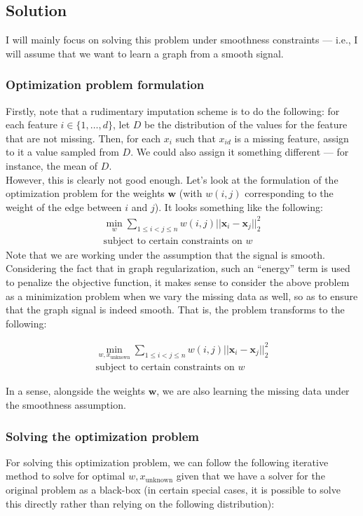 \documentclass[a4paper]{article}
\newcommand{\nl}{\vspace{0.2cm}\\}
\newcommand{\mf}{\mathbf}
\begin{document}
\subsection{Solution}
I will mainly focus on solving this problem under smoothness constraints --- i.e., I will assume that we want to learn a graph from a smooth signal.

\subsubsection{Optimization problem formulation}
Firstly, note that a rudimentary imputation scheme is to do the following: for each feature $i \in \{1, \ldots, d\}$, let $D$ be the distribution of the values for the feature that are not
missing. Then, for each $x_i$ such that $x_{id}$ is a missing feature, assign to it a value sampled from $D$. We could also assign it something different --- for instance, the mean of $D$.\nl
However, this is clearly not good enough. Let's look at the formulation of the optimization problem for the weights $\mf{w}$ (with $w(i, j)$ corresponding to the weight of the edge between
$i$ and $j$). It looks something like the following:\\
\begin{align*}
    \min_{w} \sum_{1 \le i < j \le n} w(i, j) ||\mf{x}_i - \mf{x}_j||_2^2\\
    \text{subject to certain constraints on }w
\end{align*}
Note that we are working under the assumption that the signal is smooth. Considering the fact that in graph regularization, such an ``energy'' term is used to penalize the objective function, it
makes sense to consider the above problem as a minimization problem when we vary the missing data as well, so as to ensure that the graph signal is indeed smooth. That is, the problem transforms to the following:

\begin{align*}
    \min_{w, x_{\text{unknown}}} \sum_{1 \le i < j \le n} w(i, j) ||\mf{x}_i - \mf{x}_j||_2^2\\
    \text{subject to certain constraints on }w
\end{align*}

In a sense, alongside the weights $\mf{w}$, we are also learning the missing data under the smoothness assumption.

\subsubsection{Solving the optimization problem}
For solving this optimization problem, we can follow the following iterative method to solve for optimal $w, x_{\text{unknown}}$ given that we have a solver for the original problem as a
black-box (in certain special cases, it is possible to solve this directly rather than relying on the following distribution):
\end{document}
